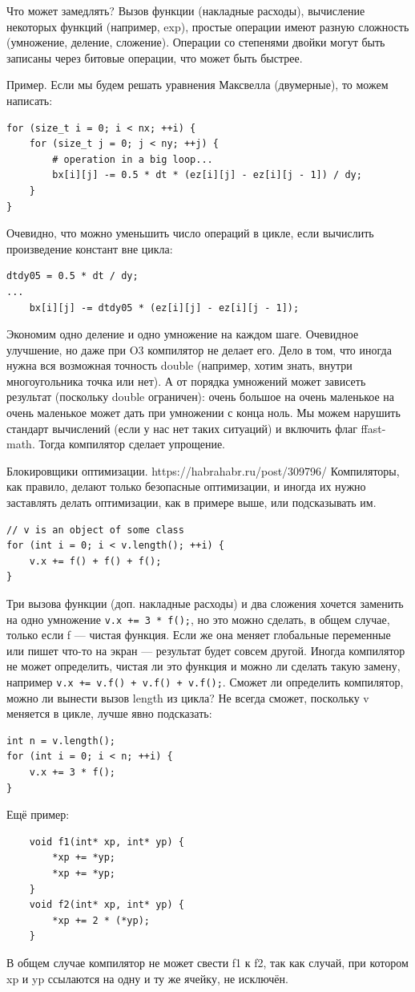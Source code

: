 \documentclass{book}
\begin{document}
Что может замедлять? Вызов функции (накладные расходы), вычисление некоторых функций (например,
exp), простые операции имеют разную сложность (умножение, деление, сложение). Операции со степенями
двойки могут быть записаны через битовые операции, что может быть быстрее.

Пример. Если мы будем решать уравнения Максвелла (двумерные), то можем написать:
\begin{verbatim}
for (size_t i = 0; i < nx; ++i) {
    for (size_t j = 0; j < ny; ++j) {
        # operation in a big loop...
        bx[i][j] -= 0.5 * dt * (ez[i][j] - ez[i][j - 1]) / dy;
    }
}
\end{verbatim}
Очевидно, что можно уменьшить число операций в цикле, если вычислить произведение констант вне
цикла:
\begin{verbatim}
dtdy05 = 0.5 * dt / dy;
...
    bx[i][j] -= dtdy05 * (ez[i][j] - ez[i][j - 1]);
\end{verbatim}
Экономим одно деление и одно умножение на каждом шаге. Очевидное улучшение, но даже при O3
компилятор не делает его. Дело в том, что иногда нужна вся возможная точность double (например,
хотим знать, внутри многоугольника точка или нет). А от порядка умножений может зависеть результат
(поскольку double ограничен): очень большое на очень маленькое на очень маленькое может дать при
умножении с конца ноль. Мы можем нарушить стандарт вычислений (если у нас нет таких ситуаций) и
включить флаг ffast-math. Тогда компилятор сделает упрощение.

Блокировщики оптимизации. https://habrahabr.ru/post/309796/
Компиляторы, как правило, делают только безопасные оптимизации, и иногда их нужно заставлять делать
оптимизации, как в примере выше, или подсказывать им.
\begin{verbatim}
// v is an object of some class
for (int i = 0; i < v.length(); ++i) {
    v.x += f() + f() + f();
}
\end{verbatim}
Три вызова функции (доп. накладные расходы) и два сложения хочется заменить на одно умножение
\texttt{v.x += 3 * f();}, но это можно сделать, в общем случае, только если f --- чистая
функция. Если же она меняет глобальные переменные или пишет что-то на экран --- результат будет
совсем другой. Иногда компилятор не может определить, чистая ли это функция и можно ли сделать
такую замену, например \texttt{v.x += v.f() + v.f() + v.f();}. Сможет ли определить
компилятор, можно ли вынести вызов length из цикла? Не всегда сможет, поскольку v меняется в цикле,
лучше явно подсказать:
\begin{verbatim}
int n = v.length();
for (int i = 0; i < n; ++i) {
    v.x += 3 * f();
}
\end{verbatim}
Ещё пример:
\begin{verbatim}
    void f1(int* xp, int* yp) {
        *xp += *yp;
        *xp += *yp;
    }
    void f2(int* xp, int* yp) {
        *xp += 2 * (*yp);
    }
\end{verbatim}
В общем случае компилятор не может свести f1 к f2, так как случай, при котором xp и yp ссылаются на
одну и ту же ячейку, не исключён.
\end{document}
